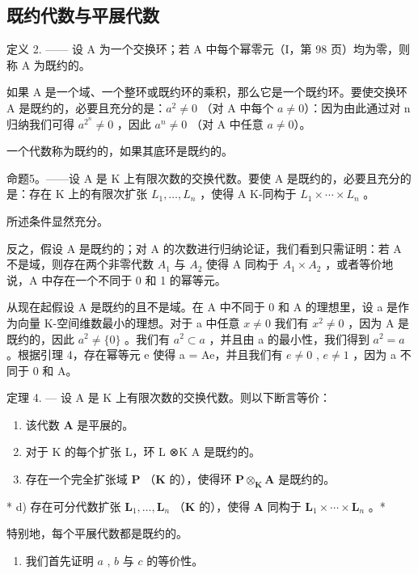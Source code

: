 \subsection{既约代数与平展代数}

定义 2. —— 设 A 为一个交换环；若 A 中每个幂零元（I，第 98 页）均为零，则称 A 为既约的。

如果 A 是一个域、一个整环或既约环的乘积，那么它是一个既约环。要使交换环 A 是既约的，必要且充分的是：\(a^{2} \neq 0\) （对 A 中每个 \(a \neq 0\)）：因为由此通过对 n 归纳我们可得 \(a^{2^{n}} \neq 0\) ，因此 \(a^{n} \neq 0\) （对 A 中任意 \(a \neq 0\)）。

一个代数称为既约的，如果其底环是既约的。

命题5。——设 A 是 K 上有限次数的交换代数。要使 A 是既约的，必要且充分的是：存在 K 上的有限次扩张 \(L_{1}, \ldots, L_{n}\) ，使得 A K-同构于 \(L_{1} \times \cdots \times L_{n}\) 。

所述条件显然充分。

反之，假设 A 是既约的；对 A 的次数进行归纳论证，我们看到只需证明：若 A 不是域，则存在两个非零代数 \(A_{1}\) 与 \(A_{2}\) 使得 A 同构于 \(A_{1} \times A_{2}\) ，或者等价地说，A 中存在一个不同于 0 和 1 的幂等元。

从现在起假设 A 是既约的且不是域。在 A 中不同于 0 和 A 的理想里，设 a 是作为向量 K-空间维数最小的理想。对于 a 中任意 \(x \neq 0\) 我们有 \(x^{2} \neq 0\) ，因为 A 是既约的，因此 \(a^{2} \neq \{0\}\) 。我们有 \(a^{2} \subset a\) ，并且由 a 的最小性，我们得到 \(a^{2} = a\) 。根据引理 4，存在幂等元 e 使得 a = Ae，并且我们有 \(e \neq 0\) , \(e \neq 1\) ，因为 a 不同于 0 和 A。

定理 4. --- 设 A 是 K 上有限次数的交换代数。则以下断言等价：

\begin{enumerate}
\def\labelenumi{\alph{enumi})}
\item
  该代数 \(\mathbf{A}\) 是平展的。
\item
  对于 K 的每个扩张 L，环 L ⊗K A 是既约的。
\item
  存在一个完全扩张域 \(\mathbf{P}\) （\(\mathbf{K}\) 的），使得环 \(\mathbf{P} \otimes_{\mathbf{K}} \mathbf{A}\) 是既约的。
\end{enumerate}

* d) 存在可分代数扩张 \(\mathbf{L}_1, \ldots, \mathbf{L}_n\) （\(\mathbf{K}\) 的），使得 \(\mathbf{A}\) 同构于 \(\mathbf{L}_1 \times \cdots \times \mathbf{L}_n\) 。*

特别地，每个平展代数都是既约的。

\begin{enumerate}
\def\labelenumi{\Alph{enumi})}
\tightlist
\item
  我们首先证明 \(a\) , \(b\) 与 \(c\) 的等价性。
\end{enumerate}

